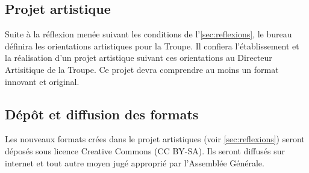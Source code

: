 \documentclass[a4paper,french,10pt]{article}
\begin{document}
\subsection{Projet artistique}
\label{sec:projet}
Suite à la réflexion menée suivant les conditions de l'\ref{sec:reflexions}, le
bureau définira les orientations artistiques pour la Troupe. Il confiera l'établissement et la réalisation d'un projet artistique suivant ces orientations au Directeur Artisitique de la Troupe. Ce projet devra comprendre au moins un
format innovant et original.





\subsection{Dépôt et diffusion des formats}
\label{sec:depot-et-diffusion}
Les nouveaux formats crées dans le projet artistiques (voir
\ref{sec:reflexions}) seront déposés sous licence Creative Commons (CC
BY-SA). Ils seront diffusés sur internet et tout autre moyen jugé approprié par l'Assemblée Générale.
\end{document}
